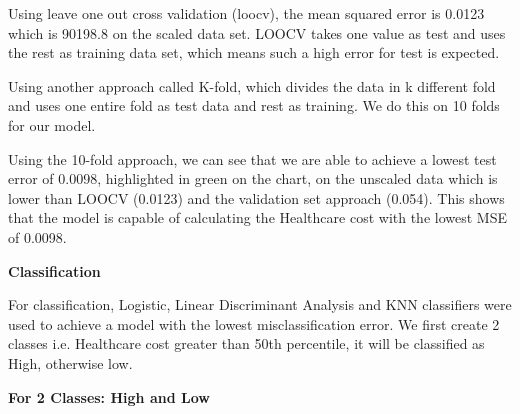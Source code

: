 \documentclass[12pt]{article}
\begin{document}

\begin{justify}
Using leave one out cross validation (loocv), the mean squared error is 0.0123 which is 90198.8 on the scaled data set. LOOCV takes one value as test and uses the rest as training data set, which means such a high error for test is expected. 
\end{justify}\par


\vspace{\baselineskip}
\begin{justify}
Using another approach called K-fold, which divides the data in k different fold and uses one entire fold as test data and rest as training. We do this on 10 folds for our model.
\end{justify}\par


\vspace{\baselineskip}
\begin{justify}
Using the 10-fold approach, we can see that we are able to achieve a lowest test error of 0.0098, highlighted in green on the chart, on the unscaled data which is lower than LOOCV (0.0123) and the validation set approach (0.054). This shows that the model is capable of calculating the Healthcare cost with the lowest MSE of 0.0098. 
\end{justify}\par


\vspace{\baselineskip}
\begin{Center}
\textbf{Classification}
\end{Center}\par


\vspace{\baselineskip}
\begin{justify}
For classification, Logistic, Linear Discriminant Analysis and KNN classifiers were used to achieve a model with the lowest misclassification error. We first create 2 classes i.e. Healthcare cost greater than 50th percentile, it will be classified as High, otherwise low.
\end{justify}\par


\vspace{\baselineskip}
\begin{adjustwidth}{2.0in}{0.0in}
\begin{justify}
\textbf{For 2 Classes: High and Low }
\end{justify}\par

\end{adjustwidth}
\end{document}
